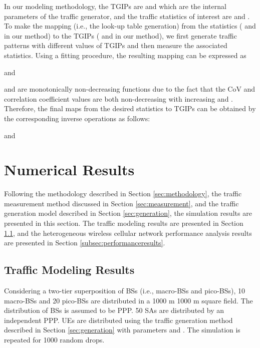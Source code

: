 \documentclass[journal]{IEEEtran}
\begin{document}
In our modeling methodology, the TGIPs are  and  which are the internal parameters of the traffic generator, and the traffic statistics of interest are  and . To make the mapping (i.e., the look-up table generation) from the statistics ( and  in our method) to the TGIPs ( and  in our method), we first generate traffic patterns with different values of TGIPs and then measure the associated statistics. Using a fitting procedure, the resulting mapping can be expressed as

and


 and  are monotonically non-decreasing functions due to the fact that the CoV and correlation coefficient values are both non-decreasing with increasing  and . Therefore, the final maps from the desired statistics to TGIPs can be obtained by the corresponding inverse operations as follows:

and












\section{Numerical Results}
\label{sec:results}

Following the methodology described in Section \ref{sec:methodology}, the traffic measurement method discussed in Section \ref{sec:measurement}, and the traffic generation model described in Section \ref{sec:generation}, the simulation results are presented in this section. The traffic modeling results are presented in Section \ref{subsec:modelingresults}, and the heterogeneous wireless cellular network performance analysis results are presented in Section \ref{subsec:performanceresults}.

\subsection{Traffic Modeling Results}
\label{subsec:modelingresults}

Considering a two-tier superposition of BSs (i.e., macro-BSs and pico-BSs), 10 macro-BSs and 20 pico-BSs are distributed in a 1000 m  1000 m square field. The distribution of BSs is assumed to be PPP. 50 SAs are distributed by an independent PPP. UEs are distributed using the traffic generation method described in Section \ref{sec:generation} with parameters  and . The simulation is repeated for 1000 random drops.
\end{document}
